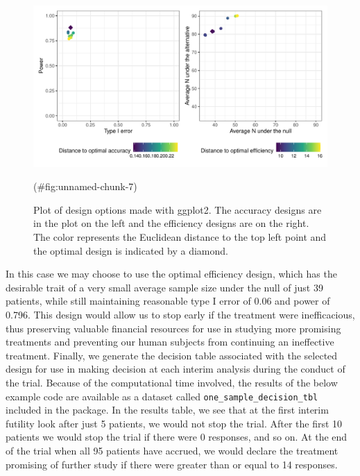\begin{Schunk}
\begin{figure}
\includegraphics[width=1.1\linewidth]{zabor-hobbs-kane_files/figure-latex/unnamed-chunk-7-1} \caption[Plot of design options made with ggplot2]{Plot of design options made with ggplot2. The accuracy designs are in the plot on the left and the efficiency designs are on the right. The color represents the Euclidean distance to the top left point and the optimal design is indicated by a diamond.}(\#fig:unnamed-chunk-7)
\end{figure}
\end{Schunk}

In this case we may choose to use the optimal efficiency design, which
has the desirable trait of a very small average sample size under the
null of just 39 patients, while still maintaining reasonable type I
error of 0.06 and power of 0.796. This design would allow us to stop
early if the treatment were inefficacious, thus preserving valuable
financial resources for use in studying more promising treatments and
preventing our human subjects from continuing an ineffective treatment.
Finally, we generate the decision table associated with the selected
design for use in making decision at each interim analysis during the
conduct of the trial. Because of the computational time involved, the
results of the below example code are available as a dataset called
\texttt{one\_sample\_decision\_tbl} included in the 
package. In the results table, we see that at the first interim futility
look after just 5 patients, we would not stop the trial. After the first
10 patients we would stop the trial if there were 0 responses, and so
on. At the end of the trial when all 95 patients have accrued, we would
declare the treatment promising of further study if there were greater
than or equal to 14 responses.

